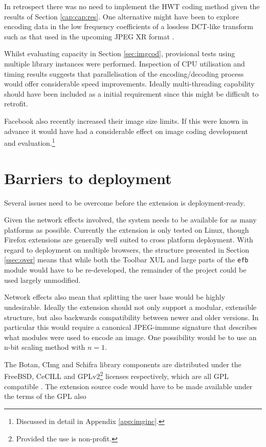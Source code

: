 In retrospect there was no need to implement the HWT coding method given the results of Section \ref{cap:cap:res}. One alternative might have been to explore encoding data in the low frequency coefficients of a lossless DCT-like transform such as that used in the upcoming JPEG XR format \cite{jpegxr}.

Whilst evaluating capacity in Section \ref{sec:imgcod}, provisional tests using multiple library instances were performed. Inspection of CPU utilisation and timing results suggests that parallelisation of the encoding/decoding process would offer considerable speed improvements. Ideally multi-threading capability should have been included as a initial requirement since this might be difficult to retrofit.

Facebook also recently increased their image size limits. If this were known in advance it would have had a considerable effect on image coding development and evaluation.\footnote{Discussed in detail in Appendix \ref{app:imginc}.}

\section{Barriers to deployment}
\label{sec:deploy}

Several issues need to be overcome before the extension is deployment-ready.

Given the network effects involved, the system needs to be available for as many platforms as possible. Currently the extension is only tested on Linux, though Firefox extensions are generally well suited to cross platform deployment. With regard to deployment on multiple browsers, the structure presented in Section \ref{ssec:over} means that while both the Toolbar XUL and large parts of the {\tt efb} module would have to be re-developed, the remainder of the project could be used largely unmodified.

Network effects also mean that splitting the user base would be highly undesirable. Ideally the extension should not only support a modular, extensible structure, but also backwards compatibility between newer and older versions. In particular this would require a canonical JPEG-immune signature that describes what modules were used to encode an image. One possibility would be to use an n-bit scaling method with $n=1$.

The Botan, CImg and Schifra library components are distributed under the FreeBSD, CeCILL and GPLv2\footnote{Provided the use is non-profit.} licenses respectively, which are all GPL compatible \cite{gpl}. The extension source code would have to be made available under the terms of the GPL also


